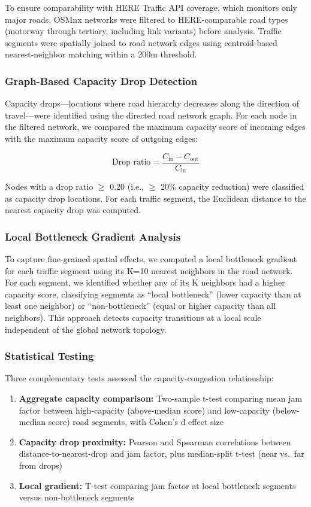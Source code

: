 \documentclass[12pt,a4paper]{article}
\begin{document}
To ensure comparability with HERE Traffic API coverage, which monitors only major roads, OSMnx networks were filtered to HERE-comparable road types (motorway through tertiary, including link variants) before analysis. Traffic segments were spatially joined to road network edges using centroid-based nearest-neighbor matching within a 200m threshold.

\subsubsection{Graph-Based Capacity Drop Detection}

Capacity drops---locations where road hierarchy decreases along the direction of travel---were identified using the directed road network graph. For each node in the filtered network, we compared the maximum capacity score of incoming edges with the maximum capacity score of outgoing edges:

\[\text{Drop ratio} = \frac{C_{\text{in}} - C_{\text{out}}}{C_{\text{in}}}\]

Nodes with a drop ratio $\geq$ 0.20 (i.e., $\geq$ 20\% capacity reduction) were classified as capacity drop locations. For each traffic segment, the Euclidean distance to the nearest capacity drop was computed.

\subsubsection{Local Bottleneck Gradient Analysis}

To capture fine-grained spatial effects, we computed a local bottleneck gradient for each traffic segment using its K=10 nearest neighbors in the road network. For each segment, we identified whether any of its K neighbors had a higher capacity score, classifying segments as ``local bottleneck'' (lower capacity than at least one neighbor) or ``non-bottleneck'' (equal or higher capacity than all neighbors). This approach detects capacity transitions at a local scale independent of the global network topology.

\subsubsection{Statistical Testing}

Three complementary tests assessed the capacity-congestion relationship:

\begin{enumerate}
\def\labelenumi{\arabic{enumi}.}

\item
  \textbf{Aggregate capacity comparison:} Two-sample t-test comparing mean jam factor between high-capacity (above-median score) and low-capacity (below-median score) road segments, with Cohen's d effect size
\item
  \textbf{Capacity drop proximity:} Pearson and Spearman correlations between distance-to-nearest-drop and jam factor, plus median-split t-test (near vs.~far from drops)
\item
  \textbf{Local gradient:} T-test comparing jam factor at local bottleneck segments versus non-bottleneck segments
\end{enumerate}
\end{document}
